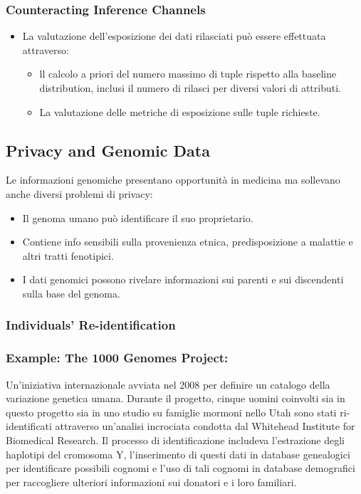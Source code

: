 \documentclass{report}
\begin{document}
\subsubsection{Counteracting Inference Channels}
\begin{itemize}
    \item La valutazione dell'esposizione dei dati rilasciati può essere effettuata attraverso:
    \begin{itemize}
        \item ll calcolo a priori del numero massimo di tuple rispetto alla baseline distribution, inclusi il numero di rilasci per diversi valori di attributi.
        \item La valutazione delle metriche di esposizione sulle tuple richieste.
    \end{itemize}
\end{itemize}

\subsection{Privacy and Genomic Data}
Le informazioni genomiche presentano opportunità in medicina ma sollevano anche diversi problemi di privacy:
\begin{itemize}
    \item Il genoma umano può identificare il suo proprietario.
    \item Contiene info sensibili sulla provenienza etnica, predisposizione a malattie e altri tratti fenotipici.
    \item I dati genomici possono rivelare informazioni sui parenti e sui discendenti sulla base del genoma.
\end{itemize}

\subsubsection{Individuals' Re-identification}
\subsubsection{Example: The 1000 Genomes Project:} Un'iniziativa internazionale avviata nel 2008 per definire un catalogo della variazione genetica umana. 
Durante il progetto, cinque uomini coinvolti sia in questo progetto sia in uno studio su famiglie mormoni nello Utah sono stati ri-identificati attraverso un'analisi incrociata condotta dal Whitehead Institute for Biomedical Research. 
Il processo di identificazione includeva l'estrazione degli haplotipi del cromosoma Y, l'inserimento di questi dati in database genealogici per identificare possibili cognomi e l'uso di tali cognomi in database demografici per raccogliere ulteriori informazioni sui donatori e i loro familiari.
\end{document}
